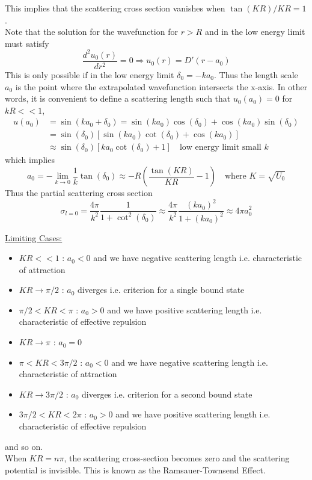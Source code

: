 \documentclass[aps,prb,onecolumn,notitlepage,showpacs,floatfix,superscriptaddress]{revtex4-1}
\begin{document}
This implies that the scattering cross section vanishes when $\tan (KR)/ KR = 1$. \\
Note that the solution for the wavefunction for $r>R$ and in the low energy limit must satisfy
\begin{equation}
\dfrac{d^2 u_0 (r)}{dr^2} =0 \Rightarrow u_0 (r) = D' (r-a_0)
\end{equation}
This is only possible if in the low energy limit $\delta_0 = -k a_0 $. Thus the length scale $a_0$ is the point where the extrapolated wavefunction intersects the x-axis. In other words, it is convenient to define a scattering length such that $u_0 (a_0) =0 $ for $kR<<1$,
\begin{equation}
\begin{split}
u(a_0) &= \sin(k a_0 +\delta_0) = \sin(k a_0) \cos(\delta_0) + \cos(k a_0) \sin(\delta_0) \\
&= \sin(\delta_0) [\sin(k a_0) \cot(\delta_0) + \cos(k a_0) ]\\
&\approx \sin(\delta_0) [k a_0 \cot(\delta_0) + 1 ] \quad \text{low energy limit small } k 
\end{split}
\end{equation}
which implies
\begin{equation}
 a_0  = - \lim_{k \rightarrow 0 } \dfrac{1}{k}\tan(\delta_0) \approx - R \left( \dfrac{\tan (KR)}{KR} -1 \right) \quad \text{where } K=\sqrt{U_0}
\end{equation}
Thus the partial scattering cross section
\begin{equation}
 \sigma_{l=0} = \dfrac{4\pi}{k^2} \dfrac{1}{1+\cot^2(\delta_0)} \approx \dfrac{4\pi}{k^2} \dfrac{(ka_0)^2}{1+(ka_0)^2} \approx 4 \pi a_0^2
\end{equation}

\underline{Limiting Cases:}
\begin{itemize}
\item  $KR << 1$ : $a_0 < 0$ and we have negative scattering length i.e. characteristic of attraction
\item  $KR \rightarrow \pi/2$ : $a_0$ diverges i.e. criterion for a single bound state
\item  $\pi/2< KR < \pi$ : $a_0 > 0$ and we have positive scattering length i.e. characteristic of effective repulsion
\item  $KR \rightarrow \pi$ : $a_0 =0$
\item  $\pi< KR < 3\pi/2$ : $a_0 < 0$ and we have negative scattering length i.e. characteristic of attraction
\item  $KR \rightarrow 3\pi/2$ : $a_0$ diverges i.e. criterion for a second bound state
\item  $3\pi/2< KR < 2\pi$ : $a_0 > 0$ and we have positive scattering length i.e. characteristic of effective repulsion 
\end{itemize}
and so on. \\

When $KR = n\pi$, the scattering cross-section becomes zero and the scattering potential is invisible. This is known as the Ramsauer-Townsend Effect.
\end{document}
